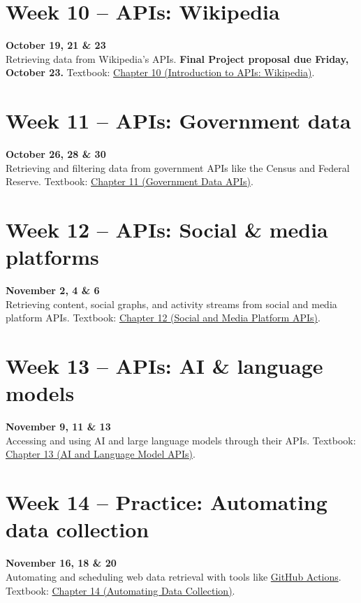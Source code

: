 \documentclass[11pt]{memoir}
\def\bookurl{https://github.com/cuinfoscience/Web-Data-Science-Book}
\begin{document}
\section{Week 10 -- APIs: Wikipedia}
\textcolor{CUGold}{\textbf{October 19, 21 \& 23}}\\
Retrieving data from Wikipedia's APIs. \textbf{Final Project proposal due Friday, October 23.} Textbook: \href{\bookurl/blob/main/ch-10-wikipedia.qmd}{Chapter 10 (Introduction to APIs: Wikipedia)}.

\section{Week 11 -- APIs: Government data}
\textcolor{CUGold}{\textbf{October 26, 28 \& 30}}\\
Retrieving and filtering data from government APIs like the Census and Federal Reserve. Textbook: \href{\bookurl/blob/main/ch-11-government.qmd}{Chapter 11 (Government Data APIs)}.

\section{Week 12 -- APIs: Social \& media platforms}
\textcolor{CUGold}{\textbf{November 2, 4 \& 6}}\\
Retrieving content, social graphs, and activity streams from social and media platform APIs. Textbook: \href{\bookurl/blob/main/ch-12-social.qmd}{Chapter 12 (Social and Media Platform APIs)}.

\section{Week 13 -- APIs: AI \& language models}
\textcolor{CUGold}{\textbf{November 9, 11 \& 13}}\\
Accessing and using AI and large language models through their APIs. Textbook: \href{\bookurl/blob/main/ch-13-ai-apis.qmd}{Chapter 13 (AI and Language Model APIs)}.

\section{Week 14 -- Practice: Automating data collection}
\textcolor{CUGold}{\textbf{November 16, 18 \& 20}}\\
Automating and scheduling web data retrieval with tools like \href{https://docs.github.com/en/actions}{GitHub Actions}. Textbook: \href{\bookurl/blob/main/ch-14-automation.qmd}{Chapter 14 (Automating Data Collection)}.
\end{document}
